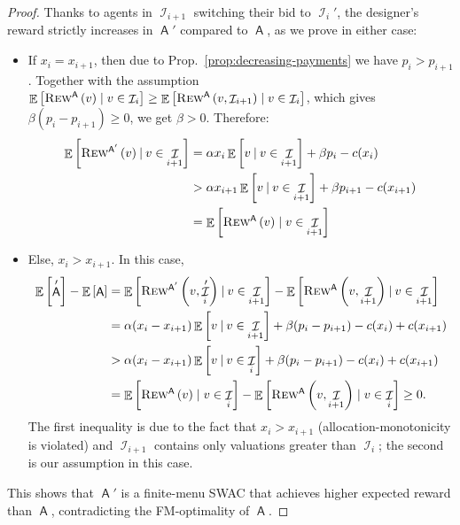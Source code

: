 \documentclass[11pt,letterpaper]{article}
\newcommand{\sqbr}[1]{\left[ #1 \right]}
\newcommand{\swac}{SWAC\xspace}
\newcommand{\finauc}{finite-menu \swac}
\DeclareMathOperator*{\E}{\bb{E}}
\newcommand{\given}{\medspace | \medspace}
\newcommand{\bb}[1]{\mathbb{#1}}
\DeclareMathOperator{\A}{\auc{A}}
\DeclareMathOperator{\I}{\mathcal{I}}
\theoremstyle{plain}
\newcommand{\auc}[1]{\mathsf{#1}}
\begin{document}
\begin{proof}
 Thanks to agents in $\I_{i+1}$
 switching their bid to $\I_i'$, 
 the designer's reward strictly increases in $\A'$ compared to $\A$, as we prove in either case:
\begin{itemize}
    \item  If $x_i=x_{i+1}$, then due to Prop.~\ref{prop:decreasing-payments} we have $p_i>p_{i+1}$. Together with the assumption $\E\sqbr{\trew[\A]{v}\mid v\in\I_i}\geq\E\sqbr{\rew[\A]{v}{\I_{i+1}}\mid v\in\I_i}$, which gives $\beta(p_i-p_{i+1})\geq0$, we get $\beta>0$. Therefore:
            \begin{align*}
            \E\sqbr{\trew[\A']{v}\given v\in\I_{i+1}}&=\alpha x_i\E\sqbr{v\given v\in\I_{i+1}}+\beta p_i-c(x_i)\\
            &>\alpha x_{i+1}\E\sqbr{v\given v\in\I_{i+1}}+\beta p_{i+1}-c(x_{i+1})\\
            &=\E\sqbr{\trew[\A]{v}\mid v\in\I_{i+1}}
            \end{align*}
    \item Else, $x_i>x_{i+1}$. In this case, 
 \begin{align*}
    \E\sqbr{\A'}-\E\sqbr{\A}&=\E\sqbr{\rew[\A']{v}{\I_i'}\given v\in\I_{i+1}}-\E\sqbr{\rew[\A]{v}{\I_{i+1}}\given v\in\I_{i+1}}\\
    &=\alpha(x_i-x_{i+1})\E\sqbr{v\given v\in\I_{i+1}}+\beta(p_i-p_{i+1})-c(x_i)+c(x_{i+1})\\
    &>\alpha(x_i-x_{i+1})\E\sqbr{v\given v\in\I_{i}}+\beta(p_i-p_{i+1})-c(x_i)+c(x_{i+1})\\
    &=\E\sqbr{\trew[\A]{v}\mid v\in\I_i}-\E\sqbr{\rew[\A]{v}{\I_{i+1}}\mid v\in\I_i}\geq0.
\end{align*}
The first inequality is due to
the fact that $x_i>x_{i+1}$ (allocation-monotonicity is violated)
and $\I_{i+1}$ contains only valuations greater than $\I_i$;
the second is our assumption in this case.
\end{itemize}

 
This shows that $\A'$ is a \finauc that achieves higher expected reward than $\A$,
contradicting the FM-optimality of $\A$.


\end{proof}
\end{document}
